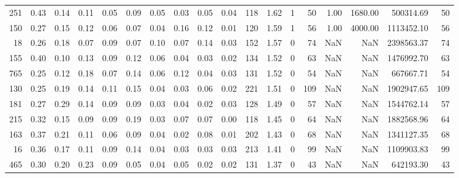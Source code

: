 \begin{tabular}{rrrrrrrrrrllrrrrrr}
          251 & 0.43 & 0.14 & 0.11 & 0.05 & 0.09 & 0.05 & 0.03 & 0.05 & 0.04 & 118 &  1.62 &                  1 &        50 &            1.00 &             1680.00 &     500314.69 &                    50 \\
          150 & 0.27 & 0.15 & 0.12 & 0.06 & 0.07 & 0.04 & 0.16 & 0.12 & 0.01 & 120 &  1.59 &                  1 &        56 &            1.00 &             4000.00 &    1113452.10 &                    56 \\
           18 & 0.26 & 0.18 & 0.07 & 0.09 & 0.07 & 0.10 & 0.07 & 0.14 & 0.03 & 152 &  1.57 &                  0 &        74 &             NaN &                 NaN &    2398563.37 &                    74 \\
          155 & 0.40 & 0.10 & 0.13 & 0.09 & 0.12 & 0.06 & 0.04 & 0.03 & 0.02 & 134 &  1.52 &                  0 &        63 &             NaN &                 NaN &    1476992.70 &                    63 \\
          765 & 0.25 & 0.12 & 0.18 & 0.07 & 0.14 & 0.06 & 0.12 & 0.04 & 0.03 & 131 &  1.52 &                  0 &        54 &             NaN &                 NaN &     667667.71 &                    54 \\
          130 & 0.25 & 0.19 & 0.14 & 0.11 & 0.15 & 0.04 & 0.03 & 0.06 & 0.02 & 221 &  1.51 &                  0 &       109 &             NaN &                 NaN &    1902947.65 &                   109 \\
          181 & 0.27 & 0.29 & 0.14 & 0.09 & 0.09 & 0.03 & 0.04 & 0.02 & 0.03 & 128 &  1.49 &                  0 &        57 &             NaN &                 NaN &    1544762.14 &                    57 \\
          215 & 0.32 & 0.15 & 0.09 & 0.09 & 0.19 & 0.03 & 0.07 & 0.07 & 0.00 & 118 &  1.45 &                  0 &        64 &             NaN &                 NaN &    1882568.96 &                    64 \\
          163 & 0.37 & 0.21 & 0.11 & 0.06 & 0.09 & 0.04 & 0.02 & 0.08 & 0.01 & 202 &  1.43 &                  0 &        68 &             NaN &                 NaN &    1341127.35 &                    68 \\
           16 & 0.36 & 0.17 & 0.11 & 0.09 & 0.14 & 0.04 & 0.03 & 0.03 & 0.03 & 213 &  1.41 &                  0 &        99 &             NaN &                 NaN &    1109903.83 &                    99 \\
          465 & 0.30 & 0.20 & 0.23 & 0.09 & 0.05 & 0.04 & 0.05 & 0.02 & 0.02 & 131 &  1.37 &                  0 &        43 &             NaN &                 NaN &     642193.30 &                    43 \\

\end{tabular}
